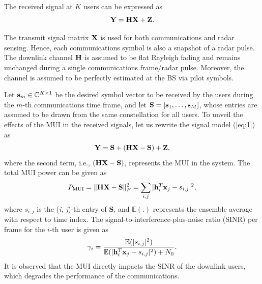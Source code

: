\documentclass[conference]{IEEEtran}
\begin{document}
The received signal at $K$ users can be expressed as
\begin{equation}
{\mathbf{Y}} = {\mathbf{H}}{\mathbf{X}} + {\mathbf{Z}}.\label{eq:1}
\end{equation}

The transmit signal matrix $ {\mathbf{X}} $ is used for both communications and radar sensing. Hence, each communications symbol is also a snapshot of a radar pulse. The downlink channel $ {\mathbf{H}} $ is assumed to be flat Rayleigh fading and remains unchanged during a single communications frame/radar pulse. Moreover, the channel is assumed to be perfectly estimated at the BS via pilot symbols.

Let ${\mathbf{s}}_m \in \mathbb{C}^{K \times 1}$ be the desired symbol vector to be received by the users during the $m$-th communications time frame, and let $\textbf{S} = [{\mathbf{s}}_1, \ldots, {\mathbf{s}}_M]$, whose entries are assumed to be drawn from the same constellation for all users. 
 To unveil the effects of the MUI in the received signals, let us rewrite the signal model (\ref{eq:1}) as
\begin{equation}
{\mathbf{Y}} = \textbf{S} + ({\mathbf{H}}{\mathbf{X}} - \textbf{S})  + {\mathbf{Z}},\label{eq:2}
\end{equation}
where the second term, i.e., $({\mathbf{H}}{\mathbf{X}} - \textbf{S})$, represents the MUI in the system. The total MUI power can be given as
\begin{equation}
P_{\textrm{MUI}} = \|{\mathbf{H}}{\mathbf{X}} - \textbf{S}\|_{F}^{2} = \sum_{i,j} |{\mathbf{h}}_i^T{\mathbf{x}}_j - s_{i,j}|^2, \label{eq:3}
\end{equation}
where $s_{i,j}$ is the (\emph{i, j})-th entry of \textbf{S}, and \begin{math}\mathbb{E}(.)\end{math} represents the ensemble average with respect to time index. The signal-to-interference-plus-noise ratio (SINR) per frame for the $i$-th user is given as
\begin{equation}
\gamma_{i} = \frac{\mathbb{E}(|s_{i,j}|^2)}{\mathbb{E}(|{\mathbf{h}}_i^T{\mathbf{x}}_j - s_{i,j}|^2) + N_0}. \label{eq:4}
\end{equation}
It is observed that the MUI directly impacts the SINR of the downlink users, which degrades the performance of the communications.
\end{document}
